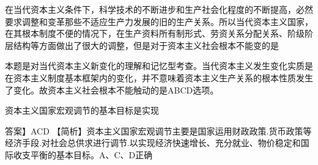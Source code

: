 \question 在当代资本主义条件下，科学技术的不断进步和生产社会化程度的不断提高，必然要求调整和变革那些不适应生产力发展的旧的生产关系。所以当代资本主义国家，在其根本制度不便的情况下，在生产资料所有制形式、劳资关系分配关系、阶级阶层结构等方面做出了很大的调整，但是对于资本主义社会根本不能变的是
\par\twoch{\textcolor{red}{生产资料私有制}}{\textcolor{red}{雇佣劳动制度}}{\textcolor{red}{追逐剩余价值的本性}}{\textcolor{red}{资本主义政治制度}}
\begin{solution}本题是对当代资本主义新变化的理解和记忆型考查。当代资本主义发生变化实质是在资本主义制度基本框架内的变化，并不意味着资本主义生产关系的根本性质发生了变化。故资本主义社会根本不能触动的是ABCD选项。
\end{solution}
\question 资本主义国家宏观调节的基本目标是实现
\par{}
\begin{solution}答案】ACD
【简析】资本主义国家宏观调节主要是国家运用财政政策.货币政策等经济手段.对社会总供求进行调节.以实现经济快速增长、充分就业、物价稳定和国际收支平衡的基本目标。A、C、D正确
\end{solution}
